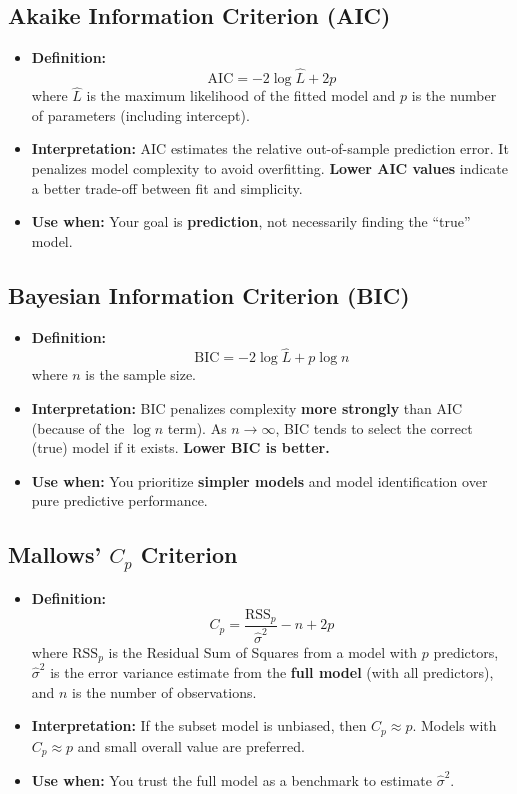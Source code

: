 \documentclass{article}
\begin{document}
\subsection{Akaike Information Criterion (AIC)}
\begin{itemize}
    \item \textbf{Definition:}
    $$\text{AIC} = -2 \log \hat{L} + 2p$$
    where $\hat{L}$ is the maximum likelihood of the fitted model and $p$ is the number of parameters (including intercept).
    \item \textbf{Interpretation:} AIC estimates the relative out-of-sample prediction error. It penalizes model complexity to avoid overfitting. \textbf{Lower AIC values} indicate a better trade-off between fit and simplicity.
    \item \textbf{Use when:} Your goal is \textbf{prediction}, not necessarily finding the ``true'' model.
\end{itemize}

\subsection{Bayesian Information Criterion (BIC)}
\begin{itemize}
    \item \textbf{Definition:}
    $$\text{BIC} = -2 \log \hat{L} + p \log n$$
    where $n$ is the sample size.
    \item \textbf{Interpretation:} BIC penalizes complexity \textbf{more strongly} than AIC (because of the $\log n$ term). As $n \to \infty$, BIC tends to select the correct (true) model if it exists. \textbf{Lower BIC is better.}
    \item \textbf{Use when:} You prioritize \textbf{simpler models} and model identification over pure predictive performance.
\end{itemize}

\subsection{Mallows' $C_p$ Criterion}
\begin{itemize}
    \item \textbf{Definition:}
    $$C_p = \frac{\text{RSS}_p}{\hat{\sigma}^2} - n + 2p$$
    where $\text{RSS}_p$ is the Residual Sum of Squares from a model with $p$ predictors, $\hat{\sigma}^2$ is the error variance estimate from the \textbf{full model} (with all predictors), and $n$ is the number of observations.
    \item \textbf{Interpretation:} If the subset model is unbiased, then $C_p \approx p$. Models with $C_p \approx p$ and small overall value are preferred.
    \item \textbf{Use when:} You trust the full model as a benchmark to estimate $\hat{\sigma}^2$.
\end{itemize}
\end{document}
